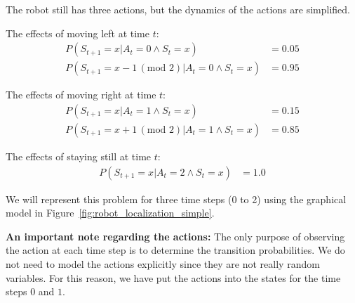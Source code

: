 \documentclass[12pt]{article}
\begin{document}
The robot still has three actions, but the dynamics of the actions are simplified. 

The effects of moving left at time $t$:
\begin{align}
P(S_{t+1} = x | A_t = 0\land S_t = x) & = 0.05 \\    
P(S_{t+1} = x - 1 \,(\text{mod } 2) | A_t = 0 \land S_t = x) & = 0.95
\end{align}

The effects of moving right at time $t$:
\begin{align}
P(S_{t+1} = x | A_t = 1\land S_t = x) & = 0.15 \\    
P(S_{t+1} = x + 1 \,(\text{mod } 2) | A_t = 1 \land S_t = x) & = 0.85
\end{align}

The effects of staying still at time $t$:
\begin{align}
P(S_{t+1} = x | A_t = 2\land S_t = x) & = 1.0
\end{align}

We will represent this problem for three time steps (0 to 2) using the graphical model in Figure~\ref{fig:robot_localization_simple}.  

{\bf An important note regarding the actions: } The only purpose of observing the action at each time step is to determine the transition probabilities. We do not need to model the actions explicitly since they are not really random variables. For this reason, we have put the actions into the states for the time steps $0$ and $1$.

\end{document}
